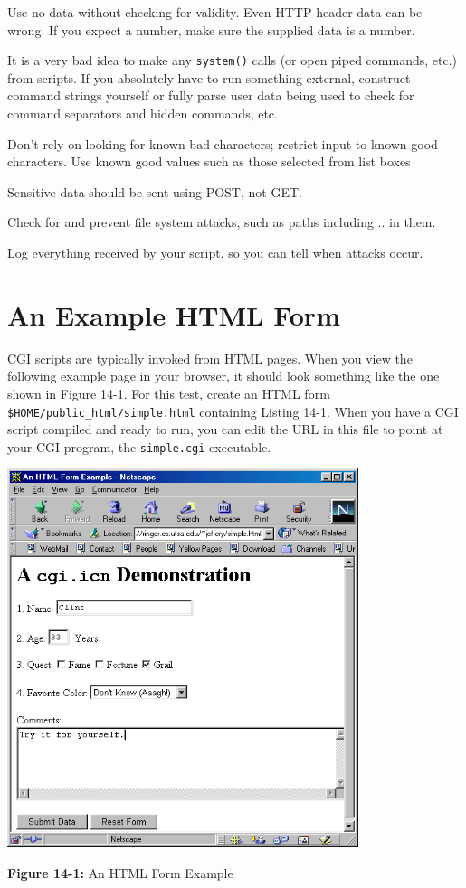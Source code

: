 {\newenvironment{itemize*}%
  {\begin{itemize}%
    \setlength{\itemsep}{0pt}%
    \setlength{\parskip}{0pt}}%
  {\end{itemize}}
\begin{itemize*}
\item Use no data without checking for validity. Even HTTP header data
can be wrong. If you expect a number, make sure the supplied data
is a number.
\item It is a very bad idea to make any \texttt{system()} calls (or open
piped commands, etc.) from scripts. If you absolutely have to run something
external, construct command strings yourself or fully parse user data being
used to check for command separators and hidden commands, etc.
\item Don't rely on looking for known bad characters; restrict input to
known good characters. Use known good values such as those selected from
list boxes
\item Sensitive data should be sent using POST, not GET.
\item Check for and prevent file system attacks, such as
paths including .. in them.
\item Log everything received by your script, so you can
tell when attacks occur.
\end{itemize*}

\section{An Example HTML Form}

CGI scripts are typically invoked from HTML pages.
When you view the following example page in your browser,
it should look something like the one shown in Figure 14-1.
For this test, create an HTML form \texttt{\$HOME/public\_html/simple.html}
containing Listing 14-1. When you have a CGI script compiled and ready to
run, you can edit the URL in this file to point at your CGI program, the
\texttt{simple.cgi} executable.
\begin{center}
\includegraphics[width=4.05in,height=4.36in]{ub-img/ub-img44.png}
\end{center}
{\sffamily\bfseries Figure 14-1:}
{\sffamily An HTML Form Example}


}
